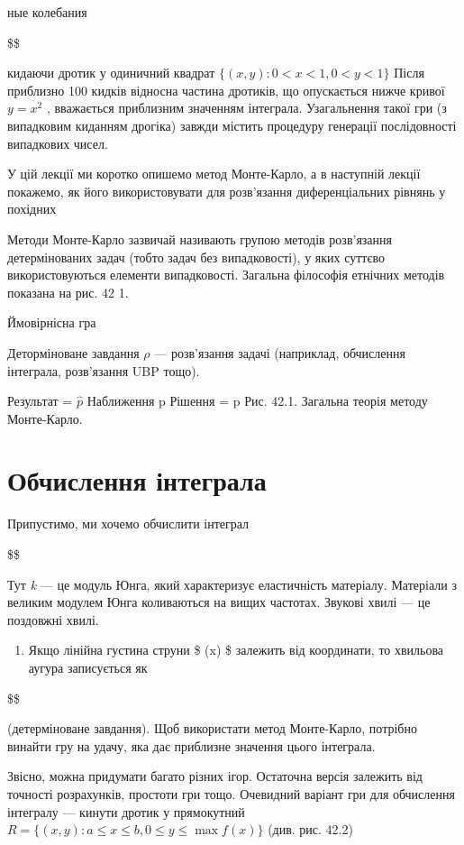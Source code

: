 \documentclass[
  ukrainian,
]{article}
\providecommand{\tightlist}{%
  \setlength{\itemsep}{0pt}\setlength{\parskip}{0pt}}
\begin{document}
ные колебания

\$\$

кидаючи дротик у одиничний квадрат \(\{(x, y): 0 < x < 1, 0 < y < 1\}\)
Після приблизно 100 кидків відносна частина дротиків, що опускається
нижче кривої \(y = x^2\) , вважається приблизним значенням інтеграла.
Узагальнення такої гри (з випадковим киданням дрогіка) завжди містить
процедуру генерації послідовності випадкових чисел.

У цій лекції ми коротко опишемо метод Монте-Карло, а в наступній лекції
покажемо, як його використовувати для розв'язання диференціальних
рівнянь у похідних

Методи Монте-Карло зазвичай називають групою методів розв'язання
детермінованих задач (тобто задач без випадковості), у яких суттєво
використовуються елементи випадковості. Загальна філософія етнічних
методів показана на рис. 42 1.

Ймовірнісна гра

Деторміноване завдання \(\rho\) --- розв'язання задачі (наприклад,
обчислення інтеграла, розв'язання UBP тощо).

Результат = \(\hat{p}\) Наближення p Рішення = p Рис. 42.1. Загальна
теорія методу Монте-Карло.

\section{Обчислення
інтеграла}\label{ux43eux431ux447ux438ux441ux43bux435ux43dux43dux44f-ux456ux43dux442ux435ux433ux440ux430ux43bux430}

Припустимо, ми хочемо обчислити інтеграл

\$\$

Тут \emph{k} --- це модуль Юнга, який характеризує еластичність
матеріалу. Матеріали з великим модулем Юнга коливаються на вищих
частотах. Звукові хвилі --- це поздовжні хвилі.

\begin{enumerate}
\def\labelenumi{\arabic{enumi}.}
\setcounter{enumi}{1}
\tightlist
\item
  Якщо лінійна густина струни \$ \rho(x) \$ залежить від координати, то
  хвильова аугура записується як
\end{enumerate}

\$\$

(детерміноване завдання). Щоб використати метод Монте-Карло, потрібно
винайти гру на удачу, яка дає приблизне значення цього інтеграла.

Звісно, можна придумати багато різних ігор. Остаточна версія залежить
від точності розрахунків, простоти гри тощо. Очевидний варіант гри для
обчислення інтегралу --- кинути дротик у прямокутний
\(R = \{(x,y): a \le x \le b, 0 \le y \le \max f(x)\}\) (див. рис. 42.2)
\end{document}
